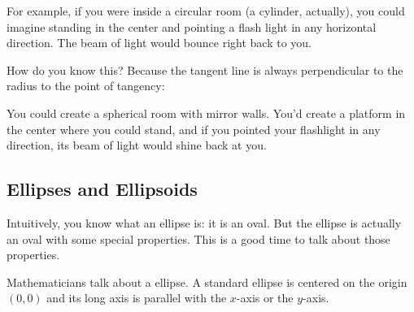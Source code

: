For example, if you were inside a circular room (a cylinder,
actually), you could imagine standing in the center and pointing a
flash light in any horizontal direction.  The beam of light would
bounce right back to you.


How do you know this?  Because the tangent line is always perpendicular to the radius to the point of tangency:


You could create a spherical room with mirror walls. You'd
create a platform in the center where you could stand, and if you
pointed your flashlight in any direction, its beam of light would
shine back at you.

\subsection{Ellipses and Ellipsoids}

Intuitively, you know what an ellipse is: it is an oval. But the
ellipse is actually an oval with some special properties.  This is a
good time to talk about those properties.

Mathematicians talk about a  ellipse. A standard ellipse is
centered on the origin $(0,0)$ and its long axis is parallel with the
$x$-axis or the $y$-axis.

